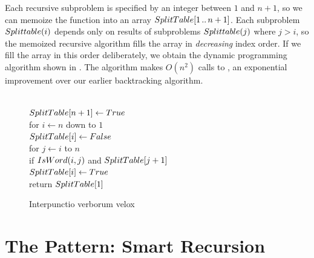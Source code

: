 Each recursive subproblem is specified by an integer between $1$ and $n+1$, so we can memoize the function  into an array $SplitTable[1\,..\,n+1]$.
Each subproblem $Splittable(i)$ depends only on results of subproblems $Splittable(j)$ where $j > i$, so the memoized recursive algorithm fills the array in \textit{decreasing} index order.
If we fill the array in this order deliberately, we obtain the dynamic programming algorithm shown in .
The algorithm makes $O(n^2)$ calls to , an exponential improvement over our earlier backtracking algorithm.

\begin{figure}[ht]
\centering
\begin{pseudocode}
\\
$SplitTable[n+1] \gets True$\\
for $i \gets n$ down to $1$\\
\Indent $SplitTable[i] \gets False$\\
\Indent for $j \gets i$ to $n$\\
\Indent\Indent if $IsWord(i, j)$ and $SplitTable[j+1]$\\
\Indent\Indent\Indent $SplitTable[i] \gets True$\\
return $SplitTable[1]$
\end{pseudocode}
\caption{Interpunctio verborum velox}
\label{fig:3.3}
\end{figure}

\section{The Pattern: Smart Recursion}
\label{sec:3.4}

